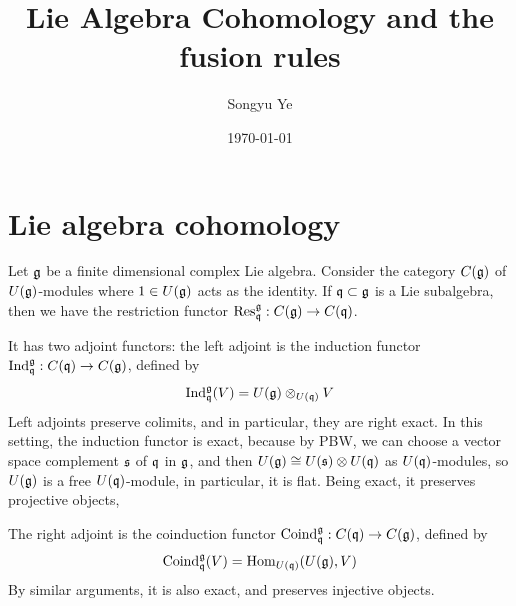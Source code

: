 \documentclass[12pt]{article}
\begin{document}
\rhead{\today}
\cfoot{\thepage}

\title{Lie Algebra Cohomology and the fusion rules}

\author{Songyu Ye}
\date{\today}
\maketitle


\begin{abstract}

\end{abstract}

\tableofcontents

\section{Lie algebra cohomology}

Let $\mathfrak{g}$ be a finite dimensional complex Lie algebra. Consider the category $C(\mathfrak{g})$ of $U(\mathfrak{g})$-modules where $1\in U(\mathfrak{g})$ acts as the identity. If $\mathfrak{q} \subset \mathfrak{g}$ is a Lie subalgebra, then we have the restriction functor $\operatorname{Res}_{\mathfrak{q}}^{\mathfrak{g}}:C(\mathfrak{g})\to C(\mathfrak{q})$.

It has two adjoint functors: the left adjoint is the induction functor $\operatorname{Ind}_{\mathfrak{q}}^{\mathfrak{g}}:C(\mathfrak{q})\to C(\mathfrak{g})$, defined by \[\operatorname{Ind}_{\mathfrak{q}}^{\mathfrak{g}}(V)=U(\mathfrak{g})\otimes_{U(\mathfrak{q})} V\] Left adjoints preserve colimits, and in particular, they are right exact. In this setting, the induction functor is exact, because by PBW, we can choose a vector space complement $\mathfrak{s}$ of $\mathfrak{q}$ in $\mathfrak{g}$, and then $U(\mathfrak{g})\cong U(\mathfrak{s})\otimes U(\mathfrak{q})$ as $U(\mathfrak{q})$-modules, so $U(\mathfrak{g})$ is a free $U(\mathfrak{q})$-module, in particular, it is flat. Being exact, it preserves projective objects, 

The right adjoint is the coinduction functor $\operatorname{Coind}_{\mathfrak{q}}^{\mathfrak{g}}:C(\mathfrak{q})\to C(\mathfrak{g})$, defined by \[\operatorname{Coind}_{\mathfrak{q}}^{\mathfrak{g}}(V)=\operatorname{Hom}_{U(\mathfrak{q})}(U(\mathfrak{g}),V)\] By similar arguments, it is also exact, and preserves injective objects.
\end{document}
